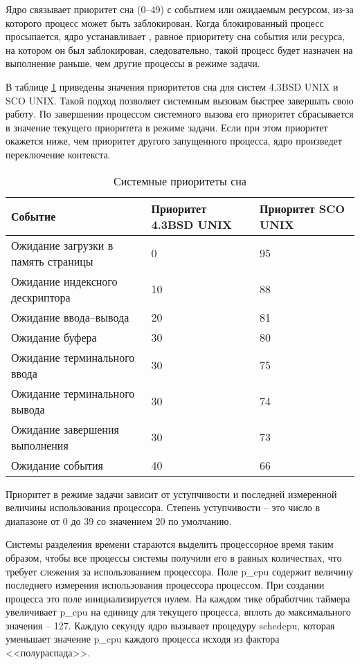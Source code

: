 Ядро связывает приоритет сна (0--49) с событием или ожидаемым ресурсом, из-за которого процесс может быть заблокирован. Когда блокированный процесс просыпается, ядро устанавливает , равное приоритету сна события или ресурса, на котором он был заблокирован, следовательно, такой процесс будет назначен на выполнение раньше, чем другие процессы в режиме задачи. 

В таблице \ref{tbl:sleeppriority} приведены значения приоритетов сна для систем {\ttfamily 4.3BSD UNIX} и {\ttfamily SCO UNIX}. Такой подход позволяет системным вызовам быстрее завершать свою работу. По завершении процессом системного вызова его приоритет сбрасывается в значение текущего приоритета в режиме задачи. Если при этом приоритет окажется ниже, чем приоритет другого запущенного процесса, ядро произведет переключение контекста.
\begin{table}[h]
	\caption{Системные приоритеты сна}
	\begin{center}
		\begin{tabular}{|l|p{75pt}|p{75pt}|} 
			\hline
			\textbf{Событие} & \textbf{Приоритет 4.3BSD UNIX} & \textbf{Приоритет SCO UNIX}\\
			\hline
			{Ожидание загрузки в память страницы} & 0 & 95\\
			\hline
			{Ожидание индексного дескриптора} & 10 & 88\\
			\hline
			{Ожидание ввода--вывода} & 20 & 81 \\
			\hline
			{Ожидание буфера} & 30 & 80\\
			\hline
			{Ожидание терминального ввода} & 30 & 75\\
			\hline
			{Ожидание терминального вывода} & 30 & 74\\
			\hline
			{Ожидание завершения выполнения} & 30 & 73\\
			\hline
			{Ожидание события} & 40 & 66\\
			\hline
		\end{tabular}
	\end{center}
	\label{tbl:sleeppriority}
\end{table}

Приоритет в режиме задачи зависит от уступчивости и последней измеренной величины использования процессора. Степень уступчивости -- это число в диапазоне от 0 до 39 со значением 20 по умолчанию. 

Системы разделения времени стараются выделить процессорное время таким образом, чтобы все процессы системы получили его в равных количествах, что требует слежения за использованием процессора. Поле {\ttfamily p{\_}cpu} содержит величину последнего измерения использования процессора процессом. При создании процесса это поле инициализируется нулем. На каждом тике обработчик таймера увеличивает {\ttfamily p{\_}cpu} на единицу для текущего процесса, вплоть до максимального значения -- 127. Каждую секунду ядро вызывает процедуру {\ttfamily schedcpu}, которая уменьшает значение {\ttfamily p{\_}cpu} каждого процесса исходя из фактора <<полураспада>>. 

